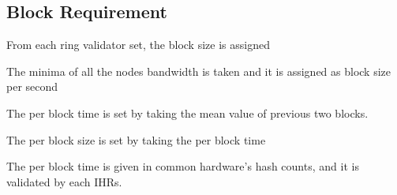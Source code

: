 \documentclass[../Bitcoin Blink.tex]{subfiles}
\begin{document}
\normalsize
\subsection{Block Requirement}

From each ring validator set, the block size is assigned

The minima of all the nodes bandwidth is taken and it is assigned as block size per second

The per block time is set by taking the mean value of previous two blocks.

The per block size is set by taking the per block time

The per block time is given in common hardware's hash counts, and it is validated by each IHRs.
\end{document}

